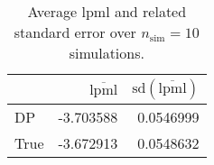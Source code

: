 \begin{table}[H]

\caption{Average lpml and related standard error over $n_{\text{sim}} = 10$ simulations.}
\centering
\begin{tabular}[t]{lrr}
\toprule
  & $\overbar{\text{lpml}}$ & $\text{sd}(\overbar{\text{lpml}})$\\
\midrule
DP & -3.703588 & 0.0546999\\
True & -3.672913 & 0.0548632\\
\bottomrule
\end{tabular}
\end{table}